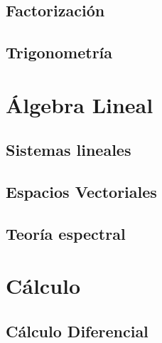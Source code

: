 \documentclass[
]{tufte-book}
\begin{document}







\chapter{Factorización}







\chapter{Trigonometría}




\part{Álgebra Lineal}

\chapter{Sistemas lineales}






\chapter{Espacios Vectoriales}







\chapter{Teoría espectral}





\part{Cálculo}

\chapter{Cálculo Diferencial}







\end{document}
